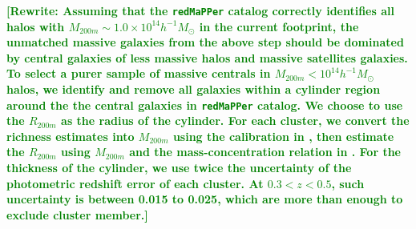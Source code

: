 \documentclass{emulateapj}
\def\redm{\texttt{redMaPPer}}
\newcommand{\alexie}[1]{\textcolor{blue}{\textbf{[Alexie: #1]}}}
\newcommand{\rewrite}[1]{\textcolor{green}{\textbf{[Rewrite: #1]}}}
\newcommand{\update}[1]{\textcolor{Bittersweet}{#1}}
\begin{document}
\begin{CJK*}{UTF8}{gbsn}
    \rewrite{Assuming that the \redm{} catalog correctly identifies all halos with 
    $M_{200m}\sim 1.0\times 10^{14} h^{-1} M_{\odot}$ in the current footprint,
    the unmatched massive galaxies from the above step should be dominated by central 
    galaxies of less massive halos and massive satellites galaxies.  
    \update{
    To select a purer sample of massive centrals in $M_{200m}<10^{14} h^{-1} M_{\odot}$
    halos, we identify and remove all galaxies within a cylinder region around the 
    the central galaxies in \redm{} catalog.
    We choose to use the $R_{200m}$ as the radius of the cylinder. 
    For each cluster, we convert the richness estimates into $M_{200m}$ using the 
    calibration in \citep{Simet2016}, then estimate the $R_{200m}$ using $M_{200m}$
    and the mass-concentration relation in \citep{Diemer2015}. 
    For the thickness of the cylinder, we use twice the uncertainty of the photometric 
    redshift error of each cluster.  
    At $0.3 < z < 0.5$, such uncertainty is between 0.015 to 0.025, which are more than 
    enough to exclude cluster member.}}
    
    

\end{CJK*}
\end{document}
